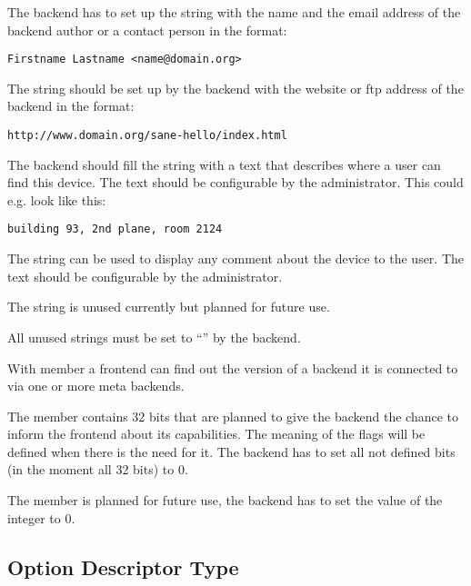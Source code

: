 \documentclass[11pt,DVIps]{report}
\begin{document}
\begin{changebar}
The backend has to set up the string 
with the name and the email address of the backend author or a contact person
in the format:
\begin{verbatim}
Firstname Lastname <name@domain.org>
\end{verbatim}

The string  should be set up by the backend
with the website or ftp address of the backend in the format:
\begin{verbatim}
http://www.domain.org/sane-hello/index.html
\end{verbatim}

The backend should fill the string  with a
text that describes where a user can find this device. The text 
should be configurable by the administrator. This could e.g. look
like this:
\begin{verbatim}
building 93, 2nd plane, room 2124
\end{verbatim}

The string  can be used to display any comment about the device
to the user. The text should be configurable by the administrator.

The string  is unused currently but planned for
future use.

All unused strings must be set to ``'' by the backend.

With member  a frontend can find
out the version of a backend it is connected to via one or more meta
backends.

The member  contains 32 bits that
are planned to give the backend the chance to inform the frontend about
its capabilities. The meaning of the flags will be defined when there
is the need for it. The backend has to set all not defined bits
(in the moment all 32 bits) to 0.

The member  is planned for future use, the backend has
to set the value of the integer to 0.
\end{changebar}

\subsection{Option Descriptor Type}\label{sec:odesc}
\end{document}
